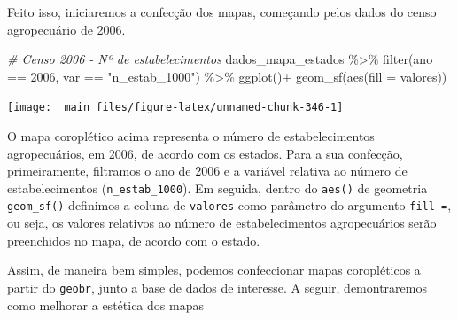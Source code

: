 \documentclass[
  brazilian,
]{book}
\newenvironment{Shaded}{\begin{snugshade}}{\end{snugshade}}
\newcommand{\AttributeTok}[1]{\textcolor[rgb]{0.77,0.63,0.00}{#1}}
\newcommand{\CommentTok}[1]{\textcolor[rgb]{0.56,0.35,0.01}{\textit{#1}}}
\newcommand{\DecValTok}[1]{\textcolor[rgb]{0.00,0.00,0.81}{#1}}
\newcommand{\FunctionTok}[1]{\textcolor[rgb]{0.00,0.00,0.00}{#1}}
\newcommand{\NormalTok}[1]{#1}
\newcommand{\SpecialCharTok}[1]{\textcolor[rgb]{0.00,0.00,0.00}{#1}}
\newcommand{\StringTok}[1]{\textcolor[rgb]{0.31,0.60,0.02}{#1}}
\begin{document}
Feito isso, iniciaremos a confecção dos mapas, começando pelos dados do censo agropecuário de 2006.

\begin{Shaded}
\begin{Highlighting}[]
\CommentTok{\# Censo 2006 {-} Nº de estabelecimentos}
\NormalTok{dados\_mapa\_estados }\SpecialCharTok{\%\textgreater{}\%} 
  \FunctionTok{filter}\NormalTok{(ano }\SpecialCharTok{==} \DecValTok{2006}\NormalTok{,}
\NormalTok{         var }\SpecialCharTok{==} \StringTok{"n\_estab\_1000"}\NormalTok{) }\SpecialCharTok{\%\textgreater{}\%} 
  \FunctionTok{ggplot}\NormalTok{()}\SpecialCharTok{+}
  \FunctionTok{geom\_sf}\NormalTok{(}\FunctionTok{aes}\NormalTok{(}\AttributeTok{fill =}\NormalTok{ valores))}
\end{Highlighting}
\end{Shaded}

\begin{center}\texttt{[image: \_main\_files/figure-latex/unnamed-chunk-346-1]} \end{center}

O mapa coroplético acima representa o número de estabelecimentos agropecuários, em 2006, de acordo com os estados. Para a sua confecção, primeiramente, filtramos o ano de 2006 e a variável relativa ao número de estabelecimentos (\texttt{n\_estab\_1000}). Em seguida, dentro do \texttt{aes()} de geometria \texttt{geom\_sf()} definimos a coluna de \texttt{valores} como parâmetro do argumento \texttt{fill\ =}, ou seja, os valores relativos ao número de estabelecimentos agropecuários serão preenchidos no mapa, de acordo com o estado.

Assim, de maneira bem simples, podemos confeccionar mapas coropléticos a partir do \texttt{geobr}, junto a base de dados de interesse. A seguir, demontraremos como melhorar a estética dos mapas
\end{document}
